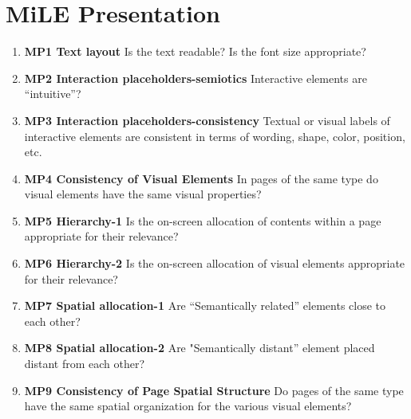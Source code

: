 \section{MiLE Presentation}

		\begin{enumerate}
			\item \textbf{MP1 Text layout} Is the text readable? Is the font size appropriate?
			\item \textbf{MP2 Interaction placeholders-semiotics} Interactive elements are “intuitive”?
			\item \textbf{MP3 Interaction placeholders-consistency} Textual or visual labels of interactive elements are consistent in terms of wording, shape, color, position, etc.
			\item \textbf{MP4 Consistency of Visual Elements} In pages of the same type do visual elements have the same visual properties?
			\item \textbf{MP5 Hierarchy-1} Is the on-screen allocation of contents within a page appropriate for their relevance?
			\item \textbf{MP6 Hierarchy-2} Is the on-screen allocation of visual elements appropriate for their relevance?
			\item \textbf{MP7 Spatial allocation-1} Are “Semantically related” elements close to each other?
			\item \textbf{MP8 Spatial allocation-2} Are "Semantically distant” element placed distant from each other?
			\item \textbf{MP9 Consistency of Page Spatial Structure} Do pages of the same type have the same spatial organization for the various visual elements?
		\end{enumerate}
